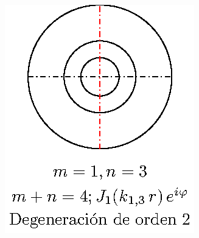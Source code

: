 \begin{minipage}{0.3\linewidth}
\begin{figure}[H]
    \centering
    \includegraphics[scale=1]{Imagenes/Modos_Vibracion_Membrana_1_3.eps}
\end{figure}
\end{minipage}


